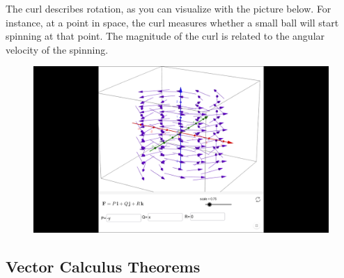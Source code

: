 \documentclass{article}
\begin{document}
\vspace{3em}
\noindent
\begin{minipage}{0.4\textwidth} %
\centering

\end{minipage} %
\hfill %
\begin{minipage}{0.4\textwidth} %
\centering
{}
\end{minipage}
\vspace{3em}

The curl describes rotation, as you can visualize with the picture below. For instance, at a point in space, the curl measures whether a small ball will start spinning at that point. The magnitude of the curl is related to the angular velocity of the spinning.

\begin{figure}
    \centering
    \includegraphics[width=1\linewidth]{Screenshot (315).png}
\end{figure}

\subsection{Vector Calculus Theorems}
\end{document}
